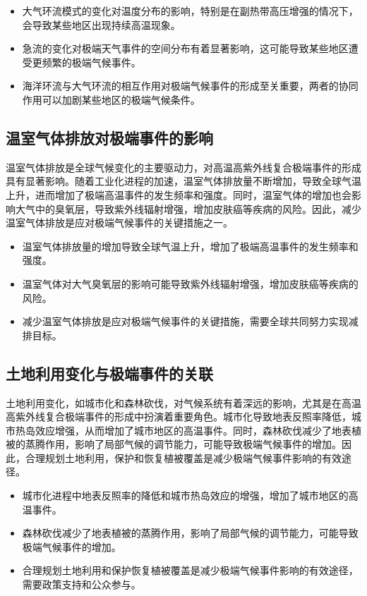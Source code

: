 \documentclass[12pt]{article}
\begin{document}
\begin{itemize}
\item 大气环流模式的变化对温度分布的影响，特别是在副热带高压增强的情况下，会导致某些地区出现持续高温现象。
\item 急流的变化对极端天气事件的空间分布有着显著影响，这可能导致某些地区遭受更频繁的极端气候事件。
\item 海洋环流与大气环流的相互作用对极端气候事件的形成至关重要，两者的协同作用可以加剧某些地区的极端气候条件。
\end{itemize}

\subsection{温室气体排放对极端事件的影响}
温室气体排放是全球气候变化的主要驱动力，对高温高紫外线复合极端事件的形成具有显著影响。随着工业化进程的加速，温室气体排放量不断增加，导致全球气温上升，进而增加了极端高温事件的发生频率和强度。同时，温室气体的增加也会影响大气中的臭氧层，导致紫外线辐射增强，增加皮肤癌等疾病的风险。因此，减少温室气体排放是应对极端气候事件的关键措施之一。

\begin{itemize}
\item 温室气体排放量的增加导致全球气温上升，增加了极端高温事件的发生频率和强度。
\item 温室气体对大气臭氧层的影响可能导致紫外线辐射增强，增加皮肤癌等疾病的风险。
\item 减少温室气体排放是应对极端气候事件的关键措施，需要全球共同努力实现减排目标。
\end{itemize}

\subsection{土地利用变化与极端事件的关联}
土地利用变化，如城市化和森林砍伐，对气候系统有着深远的影响，尤其是在高温高紫外线复合极端事件的形成中扮演着重要角色。城市化导致地表反照率降低，城市热岛效应增强，从而增加了城市地区的高温事件。同时，森林砍伐减少了地表植被的蒸腾作用，影响了局部气候的调节能力，可能导致极端气候事件的增加。因此，合理规划土地利用，保护和恢复植被覆盖是减少极端气候事件影响的有效途径。

\begin{itemize}
\item 城市化进程中地表反照率的降低和城市热岛效应的增强，增加了城市地区的高温事件。
\item 森林砍伐减少了地表植被的蒸腾作用，影响了局部气候的调节能力，可能导致极端气候事件的增加。
\item 合理规划土地利用和保护恢复植被覆盖是减少极端气候事件影响的有效途径，需要政策支持和公众参与。
\end{itemize}
\end{document}
